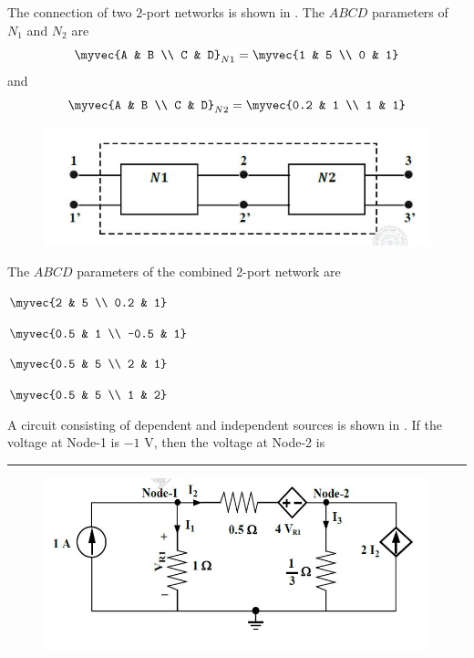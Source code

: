 \item The connection of two $2$-port networks is shown in . The $ABCD$ parameters of $N_1$ and $N_2$ are 
$$\myvec{A & B \\ C & D}_{N1} = \myvec{1 & 5 \\ 0 & 1}$$ and $$\myvec{A & B \\ C & D}_{N2} = \myvec{0.2 & 1 \\ 1 & 1}$$
\begin{figure}[H]
    \centering
    \includegraphics[width=0.5\columnwidth]{GATE/2017/IN/figs/Q-7.png}
    \caption{}
    \label{fig:placeholder_3}
\end{figure}
The $ABCD$ parameters of the combined 2-port network are \hfill{}
\begin{enumerate}
\begin{multicols}{4}
    \item $\myvec{2 & 5 \\ 0.2 & 1}$
    \item $\myvec{0.5 & 1 \\ -0.5 & 1}$
    \item $\myvec{0.5 & 5 \\ 2 & 1}$
    \item $\myvec{0.5 & 5 \\ 1 & 2}$
\end{multicols}
\end{enumerate}
\item A circuit consisting of dependent and independent sources is shown in . If the voltage at Node-1 is $-1$ V, then the voltage at Node-2 is \rule{1cm}{0.01pt}
\hfill{}
\begin{figure}[H]
    \centering
    \includegraphics[width=0.6\columnwidth]{GATE/2017/IN/figs/Q-8.png}
    \caption{}
    \label{fig:placeholder_4}
\end{figure}
